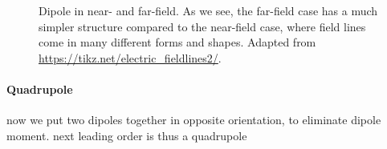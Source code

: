 \documentclass[../class_mech_main.tex]{subfiles}
\begin{document}
\begin{figure}
    \centering

    \hspace*{0.2\textwidth}%

    \caption{Dipole in near- and far-field. As we see, the far-field case has a much simpler structure compared to the near-field case, where field lines come in many different forms and shapes. Adapted from \url{https://tikz.net/electric_fieldlines2/}.}
    \label{fig:dipoles}
\end{figure}



            \paragraph{Quadrupole}
now we put two dipoles together in opposite orientation, to eliminate dipole moment. next leading order is thus a quadrupole



\end{document}
